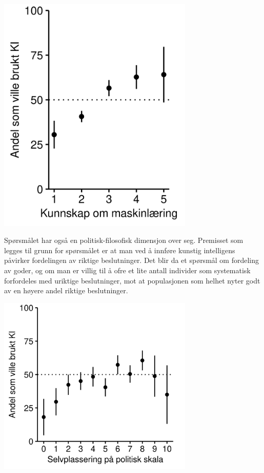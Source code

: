 \documentclass[
]{book}
\begin{document}
\includegraphics[width=0.7\textwidth,height=\textheight]{figs/png/fig_relval_ml_know.png}

Spørsmålet har også en politisk-filosofisk dimensjon over seg.
Premisset som legges til grunn for spørsmålet er at man ved å innføre kunstig intelligens påvirker fordelingen av riktige beslutninger.
Det blir da et spørsmål om fordeling av goder, og om man er villig til å ofre et lite antall individer som systematisk forfordeles med uriktige beslutninger, mot at populasjonen som helhet nyter godt av en høyere andel riktige beslutninger.

\includegraphics[width=0.7\textwidth,height=\textheight]{figs/png/fig_relval_polscale.png}
\end{document}
